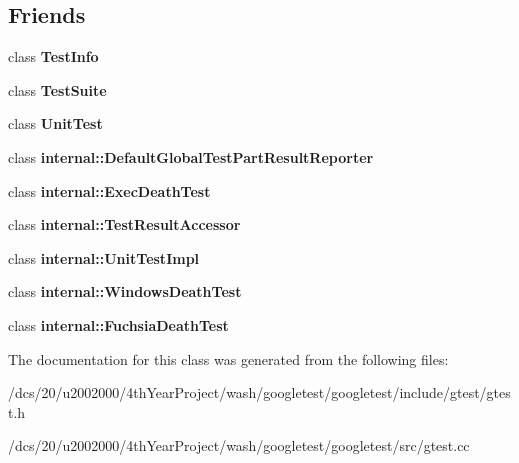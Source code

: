\subsection*{Friends}
\begin{DoxyCompactItemize}
\item 
\mbox{\label{classtesting_1_1TestResult_a4c49c2cdb6c328e6b709b4542f23de3c}} 
class {\bfseries Test\+Info}
\item 
\mbox{\label{classtesting_1_1TestResult_ab9aaba231fd11196425e75caf709bfc6}} 
class {\bfseries Test\+Suite}
\item 
\mbox{\label{classtesting_1_1TestResult_a832b4d233efee1a32feb0f4190b30d39}} 
class {\bfseries Unit\+Test}
\item 
\mbox{\label{classtesting_1_1TestResult_abae39633da9932847b41cb80efd62115}} 
class {\bfseries internal\+::\+Default\+Global\+Test\+Part\+Result\+Reporter}
\item 
\mbox{\label{classtesting_1_1TestResult_adf5553cae6aea6f8648d47e299237e34}} 
class {\bfseries internal\+::\+Exec\+Death\+Test}
\item 
\mbox{\label{classtesting_1_1TestResult_ae762da04e74a0d3b0daded3c5bd4a8e8}} 
class {\bfseries internal\+::\+Test\+Result\+Accessor}
\item 
\mbox{\label{classtesting_1_1TestResult_acc0a5e7573fd6ae7ad1878613bb86853}} 
class {\bfseries internal\+::\+Unit\+Test\+Impl}
\item 
\mbox{\label{classtesting_1_1TestResult_a6aeedc04a0590fcc1b3c5f687dbb0f9f}} 
class {\bfseries internal\+::\+Windows\+Death\+Test}
\item 
\mbox{\label{classtesting_1_1TestResult_af29d5921f68031cdfba0b28cf4b3b559}} 
class {\bfseries internal\+::\+Fuchsia\+Death\+Test}
\end{DoxyCompactItemize}


The documentation for this class was generated from the following files\+:\begin{DoxyCompactItemize}
\item 
/dcs/20/u2002000/4th\+Year\+Project/wash/googletest/googletest/include/gtest/gtest.\+h\item 
/dcs/20/u2002000/4th\+Year\+Project/wash/googletest/googletest/src/gtest.\+cc\end{DoxyCompactItemize}
